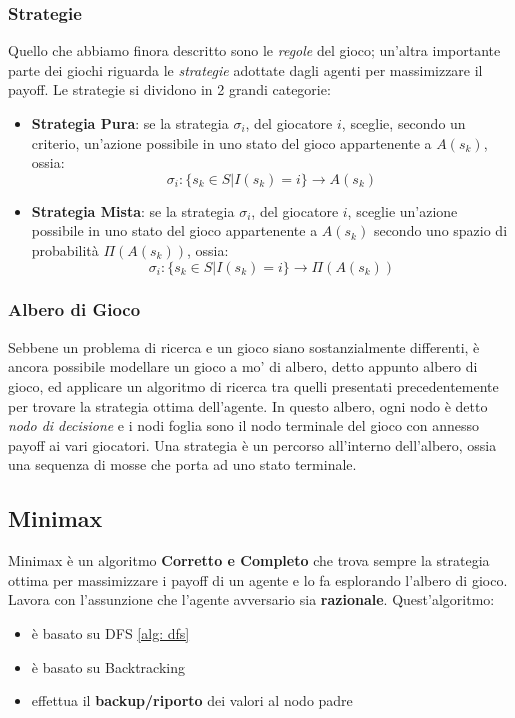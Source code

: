 \subsubsection{Strategie}
Quello che abbiamo finora descritto sono le \textit{regole} del gioco; un'altra importante parte dei giochi riguarda le \textit{strategie} adottate dagli agenti per 
massimizzare il payoff. Le strategie si dividono in 2 grandi categorie:
\begin{itemize}
    \item \textbf{Strategia Pura}: se la strategia $\sigma_i$, del giocatore $i$, sceglie, secondo un criterio, un'azione possibile in uno stato del gioco appartenente a $A(s_k)$, ossia:
    \begin{equation}
        \sigma_i : \{s_k \in S | I(s_k) = i\} \longrightarrow A(s_k)
    \end{equation}
    \item \textbf{Strategia Mista}: se la strategia $\sigma_i$, del giocatore $i$, sceglie un'azione possibile in uno stato del gioco appartenente a $A(s_k)$ secondo uno
    spazio di probabilità $\Pi(A(s_k))$, ossia:
    \begin{equation}
        \sigma_i : \{s_k \in S | I(s_k) = i\} \longrightarrow \Pi(A(s_k))
    \end{equation}
\end{itemize}

\subsubsection{Albero di Gioco}
Sebbene un problema di ricerca e un gioco siano sostanzialmente differenti, è ancora possibile modellare un gioco a mo' di albero, detto appunto albero di gioco, 
ed applicare un algoritmo di ricerca tra quelli presentati precedentemente per trovare la strategia ottima dell'agente. In questo albero, ogni nodo è detto \textit{nodo
di decisione} e i nodi foglia sono il nodo terminale del gioco con annesso payoff ai vari giocatori. Una strategia è un percorso all'interno dell'albero, ossia una sequenza di mosse
che porta ad uno stato terminale.

\subsection{Minimax}
Minimax è un algoritmo \textbf{Corretto e Completo} che trova sempre la strategia ottima per massimizzare i payoff di un agente e lo fa esplorando l'albero di gioco.
Lavora con l'assunzione che l'agente avversario sia \textbf{razionale}.
Quest'algoritmo:
\begin{itemize}
    \item è basato su DFS \eqref{alg: dfs}
    \item è basato su Backtracking
    \item effettua il \textbf{backup/riporto} dei valori al nodo padre 
\end{itemize}

